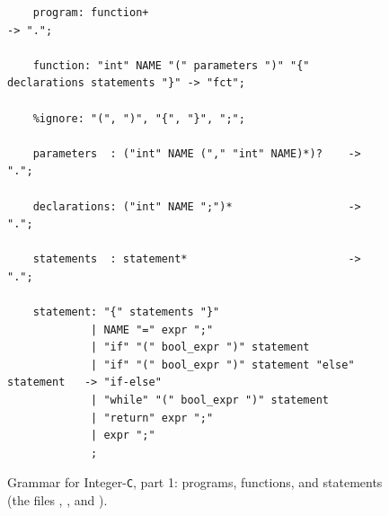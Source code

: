 \begin{figure}[!ht]
\centering
\begin{verbatim}
    program: function+                                                      -> ".";

    function: "int" NAME "(" parameters ")" "{" declarations statements "}" -> "fct";

    %ignore: "(", ")", "{", "}", ";";

    parameters  : ("int" NAME ("," "int" NAME)*)?    -> ".";

    declarations: ("int" NAME ";")*                  -> ".";

    statements  : statement*                         -> ".";

    statement: "{" statements "}"
             | NAME "=" expr ";"
             | "if" "(" bool_expr ")" statement
             | "if" "(" bool_expr ")" statement "else" statement   -> "if-else"
             | "while" "(" bool_expr ")" statement
             | "return" expr ";"
             | expr ";"
             ;
\end{verbatim}
\vspace*{-0.3cm}
\caption{Grammar for Integer-\texttt{C}, part 1: programs, functions, and statements (the files
         , , and ).}
\label{fig:Compiler.ipynb-1}
\end{figure}

